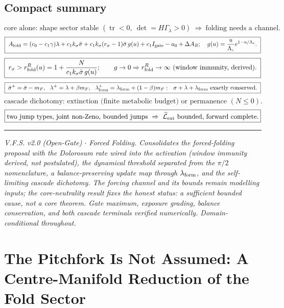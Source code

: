 \documentclass[11pt,a4paper,oneside]{book}
\newcommand{\lf}{\lambda_{\rm form}}
\newcommand{\Igate}{I_{\rm gate}}
\newcommand{\Lc}{\Lambda_c}
\newcommand{\Af}{A_{\rm fold}}
\newcommand{\rs}{r_\sigma}
\newcommand{\rR}{r^{R}_{\rm fold}}
\theoremstyle{plain}
\theoremstyle{definition}
\theoremstyle{remark}
\begin{document}
\section{Compact summary}

\[
\boxed{\text{core alone: shape sector stable }(\operatorname{tr}<0,\ \det=H\Gamma_\lambda>0)\ \Rightarrow\ \text{folding needs a channel.}}
\]
\[
\boxed{\;\Af=(c_0-c_1\gamma)\lambda+c_1k_\sigma\bar\sigma+c_1k_\sigma(\rs-1)\bar\sigma\,g(u)+c_1\Igate-a_0+\Delta A_R;\quad g(u)=\frac{u}{\Lc}e^{1-u/\Lc}.\;}
\]
\[
\boxed{\;\rs>\rR(u)=1+\frac{N}{c_1k_\sigma\bar\sigma\,g(u)};\qquad g\to0\Rightarrow\rR\to\infty\ \text{(window immunity, derived)}.\;}
\]
\[
\boxed{\;\bar\sigma^+=\bar\sigma-m_F,\ \ \lambda^+=\lambda+\beta m_F,\ \ \lf^+=\lf+(1-\beta)m_F:\ \ \sigma+\lambda+\lf\ \text{exactly conserved.}\;}
\]
\[
\boxed{\text{cascade dichotomy: extinction (finite metabolic budget) or permanence }(N\le0).}
\]
\[
\boxed{\text{two jump types, joint non-Zeno, bounded jumps}\ \Rightarrow\ \widetilde{\mathcal L}_{\rm ext}\ \text{bounded, forward complete.}}
\]

\vspace{0.5em}
\hrule
\smallskip
\noindent\footnotesize\emph{V.F.S. v2.0 (Open-Gate) $\cdot$ Forced Folding. Consolidates the
forced-folding proposal with the Dolorosum rate wired into the activation (window immunity derived, not
postulated), the dynamical threshold separated from the $\pi/2$ nomenclature, a balance-preserving update
map through $\lf$, and the self-limiting cascade dichotomy. The forcing channel and its bounds remain
modelling inputs; the core-neutrality result fixes the honest status: a sufficient bounded cause, not a
core theorem. Gate maximum, exposure grading, balance conservation, and both cascade terminals verified
numerically. Domain-conditional throughout.}

\chapter{The Pitchfork Is Not Assumed: A Centre-Manifold Reduction of the Fold Sector}
\end{document}
